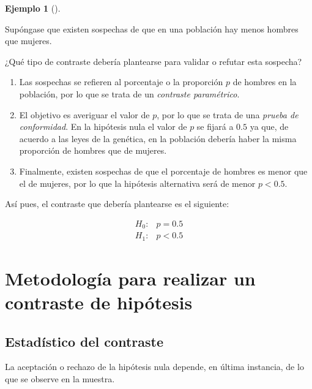 \documentclass[
  a4paper,
]{scrreport}
\theoremstyle{definition}
\theoremstyle{definition}
\newtheorem{example}{Ejemplo}[chapter]
\theoremstyle{plain}
\theoremstyle{remark}
\begin{document}
\begin{example}[]\protect\hypertarget{exm-eleccion-tipo-contraste}{}\label{exm-eleccion-tipo-contraste}

Supóngase que existen sospechas de que en una población hay menos
hombres que mujeres.

¿Qué tipo de contraste debería plantearse para validar o refutar esta
sospecha?

\begin{enumerate}
\def\labelenumi{\arabic{enumi}.}
\item
  Las sospechas se refieren al porcentaje o la proporción \(p\) de
  hombres en la población, por lo que se trata de un \emph{contraste
  paramétrico}.
\item
  El objetivo es averiguar el valor de \(p\), por lo que se trata de una
  \emph{prueba de conformidad}. En la hipótesis nula el valor de \(p\)
  se fijará a \(0.5\) ya que, de acuerdo a las leyes de la genética, en
  la población debería haber la misma proporción de hombres que de
  mujeres.
\item
  Finalmente, existen sospechas de que el porcentaje de hombres es menor
  que el de mujeres, por lo que la hipótesis alternativa será de menor
  \(p<0.5\).
\end{enumerate}

Así pues, el contraste que debería plantearse es el siguiente:

\begin{align*}
H_0: & p=0.5 \\
H_1: & p<0.5
\end{align*}

\end{example}

\hypertarget{metodologuxeda-para-realizar-un-contraste-de-hipuxf3tesis}{%
\section{Metodología para realizar un contraste de
hipótesis}\label{metodologuxeda-para-realizar-un-contraste-de-hipuxf3tesis}}

\hypertarget{estaduxedstico-del-contraste}{%
\subsection{Estadístico del
contraste}\label{estaduxedstico-del-contraste}}

La aceptación o rechazo de la hipótesis nula depende, en última
instancia, de lo que se observe en la muestra.
\end{document}
